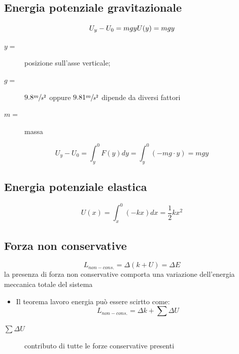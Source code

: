 \documentclass{book}
\begin{document}
\subsection{Energia potenziale gravitazionale}
\label{sec:enpotgrav}
\begin{equation}
  \label{eq:enpotgrav}
  U_y-U_0=mgy\\
  U(y)=mgy
\end{equation}
\begin{description}
\item[$y=$] posizione sull'asse verticale;
\item[$g=$] $9.8\sfrac{m}{s^2}$ oppure $9.81\sfrac{m}{s^2}$ dipende da diversi fattori
\item[$m=$] massa
\end{description}
\begin{equation*}
  U_y-U_0=\int_y^0F(y)dy=\int_y^0(-mg\cdot y)=mgy
\end{equation*}

\subsection{Energia potenziale elastica}
\label{sec:enerpotela}

\begin{equation*}
  U(x)=\int_x^0(-kx)dx=\frac{1}{2}kx^2
\end{equation*}

\subsection{Forza non conservative}
\label{sec:forzanoncon}

\begin{equation*}
  L_{non-cons.}=\Delta{}(k+U)=\Delta{}E
\end{equation*}
la presenza di forza non conservative comporta una variazione dell'energia meccanica totale del sistema
\begin{itemize}
\item Il teorema lavoro energia può essere scirtto come:
  \begin{equation*}
    L_{non-cons.}=\Delta{}k+\sum\Delta{}U
  \end{equation*}
\end{itemize}
\begin{description}
\item[$\sum\Delta U$] contributo di tutte le forze conservative presenti
\end{description}
\end{document}
